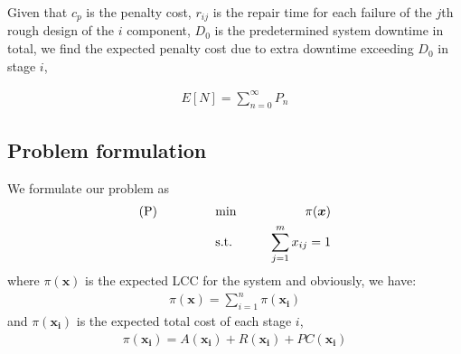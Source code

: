 \documentclass[preprint,12pt]{elsarticle}
\begin{document}
Given that $c_p$ is the penalty cost, $r_{ij}$ is the repair time for each failure of the $j$th rough design of the $i$ component, $D_0$ is the predetermined system downtime in total, we find the expected penalty cost due to extra downtime exceeding $D_0$ in stage $i$,

\begin {eqnarray}
E[N]=\sum_{n=0}^{\infty}{P_{n}}
\end {eqnarray}
 
%
%
%
\subsection{Problem formulation}
We formulate our problem as
\begin{eqnarray}
\text{(P)} \hspace{15mm} &\text{ min }& \hspace{10mm} \pi(\boldsymbol{x}) \nonumber\\
& \text{ s.t. }&  \hspace{5mm} \sum_{j=1}^{m}{x_{ij}}=1 \nonumber
\end{eqnarray}
where $\pi(\boldsymbol{x})$ is the expected LCC for the system and obviously, we have:
\begin{eqnarray}
\pi(\boldsymbol{x})=\sum_{i=1}^{n}{\pi(\boldsymbol{x_{i}})} \nonumber
\end{eqnarray}
and $\pi(\boldsymbol{x_{i}})$ is the expected total cost of each stage $i$,
\begin{eqnarray}
\pi(\boldsymbol{x_{i}})=A(\boldsymbol{x_{i}})+R(\boldsymbol{x_{i}})+PC(\boldsymbol{x_{i}}) \nonumber
\end{eqnarray}

\subsubsection{}
	
   	
\end{document}
